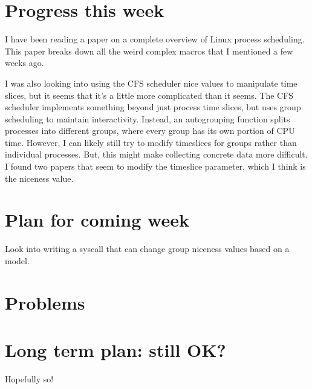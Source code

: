 \documentclass[12pt]{article}
\def\ind{\hspace*{0.3in}}
\begin{document}
\setlength{\parindent}{0in}
\addtolength{\parskip}{0.1cm}
\setlength{\fboxrule}{.5mm}\setlength{\fboxsep}{1.2mm}
\newlength{\boxlength}\setlength{\boxlength}{\textwidth}
\addtolength{\boxlength}{-4mm}
\begin{center}
\end{center}
\vspace{2mm}

\section*{Progress this week}
\ind I have been reading a paper on a complete overview of Linux process scheduling. This paper breaks down all the weird complex macros that I mentioned a few weeks ago. 

I was also looking into using the CFS scheduler nice values to manipulate time slices, but it seems that it's a little more complicated than it seems. The CFS scheduler implements something beyond just process time slices, but uses group scheduling to maintain interactivity. Instead, an autogrouping function splits processes into different groups, where every group has its own portion of CPU time. However, I can likely still try to modify timeslices for groups rather than individual processes. But, this might make collecting concrete data more difficult. I found two papers that seem to modify the timeslice parameter, which I think is the niceness value. 

\section*{Plan for coming week}
Look into writing a syscall that can change group niceness values based on a model.

\section*{Problems}

\section*{Long term plan: still OK?}
Hopefully so! 
\end{document}
